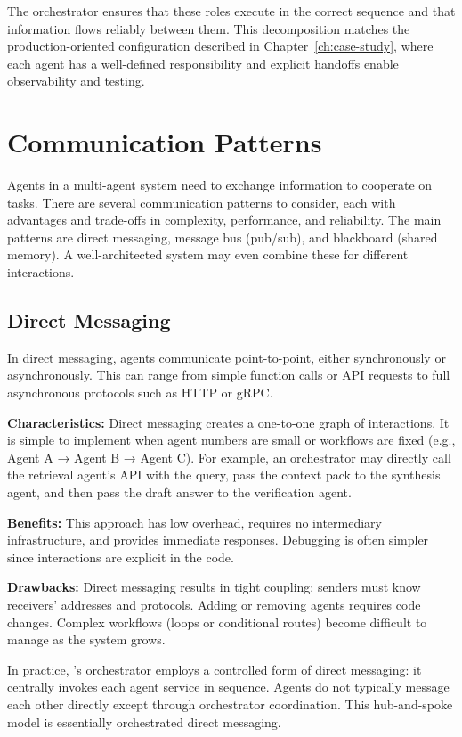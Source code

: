The orchestrator ensures that these roles execute in the correct sequence and that information flows reliably between them. This decomposition matches the production-oriented configuration described in Chapter~\ref{ch:case-study}, where each agent has a well-defined responsibility and explicit handoffs enable observability and testing.  

\section{Communication Patterns}

Agents in a multi-agent system need to exchange information to cooperate on tasks. There are several communication patterns to consider, each with advantages and trade-offs in complexity, performance, and reliability. The main patterns are direct messaging, message bus (pub/sub), and blackboard (shared memory). A well-architected system may even combine these for different interactions.  

\subsection{Direct Messaging}
In direct messaging, agents communicate point-to-point, either synchronously or asynchronously. This can range from simple function calls or API requests to full asynchronous protocols such as HTTP or gRPC.  

\textbf{Characteristics:} Direct messaging creates a one-to-one graph of interactions. It is simple to implement when agent numbers are small or workflows are fixed (e.g., Agent A → Agent B → Agent C). For example, an orchestrator may directly call the retrieval agent's API with the query, pass the context pack to the synthesis agent, and then pass the draft answer to the verification agent.  

\textbf{Benefits:} This approach has low overhead, requires no intermediary infrastructure, and provides immediate responses. Debugging is often simpler since interactions are explicit in the code.  

\textbf{Drawbacks:} Direct messaging results in tight coupling: senders must know receivers’ addresses and protocols. Adding or removing agents requires code changes. Complex workflows (loops or conditional routes) become difficult to manage as the system grows.  

In practice, \ishtar{}’s orchestrator employs a controlled form of direct messaging: it centrally invokes each agent service in sequence. Agents do not typically message each other directly except through orchestrator coordination. This hub-and-spoke model is essentially orchestrated direct messaging.  

